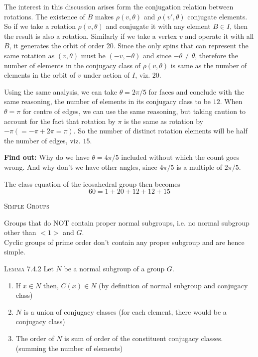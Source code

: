 \documentclass[12pt]{article}
\begin{document}
The interest in this discussion arises form the conjugation relation between rotations. The existence of $B$ makes $\rho{(v,\theta)}$ and $\rho{(v',\theta)}$ conjugate elements. So if we take a rotation $\rho{(v,\theta)}$ and conjugate it with any element $B \in I$, then the result is also a rotation. Similarly if we take a vertex $v$ and operate it with all $B$, it generates the orbit of order 20. Since the only spins that can represent the same rotation as $(v,\theta)$ must be $(-v,-\theta)$ and since $-\theta \neq \theta$, therefore the number of elements in the conjugacy class of $\rho{(v,\theta)}$ is same as the number of elements in the orbit of $v$ under action of $I$, viz. $20$.
\par
Using the same analysis, we can take $\theta = 2\pi / 5$ for faces and conclude with the same reasoning, the number of elements in its conjugacy class to be $12$. When $\theta = \pi$ for centre of edges, we can use the same reasoning, but taking caution to account for the fact that rotation by $\pi$ is the same as rotation by $-\pi (=-\pi + 2 \pi =\pi)$. So the number of distinct rotation elements will be half the number of edges, viz. $15$.
\par
{\bf Find out: } Why do we have $\theta = 4\pi / 5$ included without which the count goes wrong. And why don't we have other angles, since $4\pi/5$ is a multiple of $2\pi/5$.
\par
The class equation of the icosahedral group then becomes\\
\begin{equation}
60 = 1 + 20 + 12 + 12 + 15
\label{IcosahedralClass}
\end{equation}
\par
\textsc {Simple Groups}
\par
Groups that do NOT contain proper normal subgroups, i.e. no normal subgroup other than $<1>$ and $G$.\\
Cyclic groups of prime order don't contain any proper subgroup and are hence simple.
\par
\textsc {Lemma 7.4.2 } Let $N$ be a normal subgroup of a group $G$.
\begin{enumerate}
\item If $x \in N$ then, $C(x) \in N$ (by definition of normal subgroup and conjugacy class)
\item $N$ is a union of conjugacy classes (for each element, there would be a conjugacy class)
\item The order of $N$ is sum of order of the constituent conjugacy classes. (summing the number of elements)
\end{enumerate}
\end{document}
